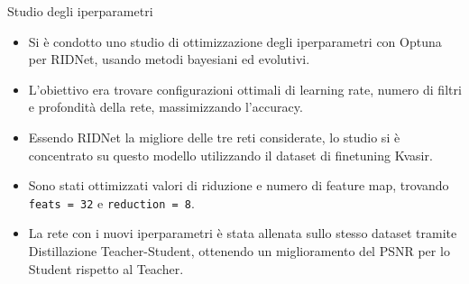 \documentclass{beamer}
\begin{document}
\begin{frame}{Studio degli iperparametri}
  \begin{itemize}
    \item Si è condotto uno studio di ottimizzazione degli iperparametri con Optuna per RIDNet, usando metodi bayesiani ed evolutivi.
    \item L'obiettivo era trovare configurazioni ottimali di learning rate, numero di filtri e profondità della rete, massimizzando l'accuracy.
    \item Essendo RIDNet la migliore delle tre reti considerate, lo studio si è concentrato su questo modello utilizzando il dataset di finetuning Kvasir.
    \item Sono stati ottimizzati valori di riduzione e numero di feature map, trovando \texttt{feats = 32} e \texttt{reduction = 8}.
    \item La rete con i nuovi iperparametri è stata allenata sullo stesso dataset tramite Distillazione Teacher-Student, ottenendo un miglioramento del PSNR per lo Student rispetto al Teacher.
  \end{itemize}
\end{frame}
\end{document}
